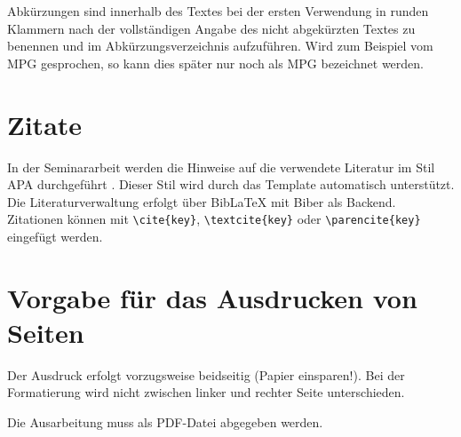 Abkürzungen sind innerhalb des Textes bei der ersten Verwendung in runden Klammern nach der vollständigen Angabe des nicht abgekürzten Textes zu benennen und im Abkürzungsverzeichnis aufzuführen. Wird zum Beispiel vom \gls{MPG} gesprochen, so kann dies später nur noch als \gls{MPG} bezeichnet werden.

\section{Zitate}
\label{sec:zitate}

In der Seminararbeit werden die Hinweise auf die verwendete Literatur im Stil APA durchgeführt \parencite{theisen2013}. Dieser Stil wird durch das Template automatisch unterstützt. Die Literaturverwaltung erfolgt über BibLaTeX mit Biber als Backend. Zitationen können mit \texttt{\textbackslash cite\{key\}}, \texttt{\textbackslash textcite\{key\}} oder \texttt{\textbackslash parencite\{key\}} eingefügt werden.

\section{Vorgabe für das Ausdrucken von Seiten}
\label{sec:ausdruck}

Der Ausdruck erfolgt vorzugsweise beidseitig (Papier einsparen!). Bei der Formatierung wird nicht zwischen linker und rechter Seite unterschieden.

Die Ausarbeitung muss als PDF-Datei abgegeben werden.

